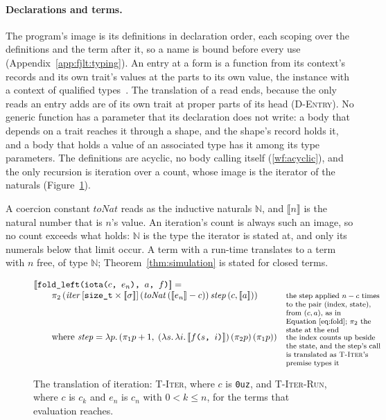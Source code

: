 \paragraph{Declarations and terms.}
The program's image is its definitions in declaration order, each scoping over the definitions and the term after it, so a name is bound before every use (Appendix~\ref{app:fjlt:typing}).
An entry at a form is a function from its context's records and its own trait's values at the parts to its own value, the instance with a context of qualified types~\cite{jones1994qualified}.
The translation of a read ends, because the only reads an entry adds are of its own trait at proper parts of its head (\textsc{D-Entry}).
No generic function has a parameter that its declaration does not write: a body that depends on a trait reaches it through a shape, and the shape's record holds it, and a body that holds a value of an associated type has it among its type parameters.
The definitions are acyclic, no body calling itself (\ref{wf:acyclic}), and the only recursion is iteration over a count, whose image is the iterator of the naturals (Figure~\ref{fig:fjlt-recursion}).

A coercion constant $\mathit{toNat}$ reads  as the inductive naturals $\mathbb{N}$, and $\llbracket n \rrbracket$ is the natural number that is $n$'s value.
An iteration's count is always such an image, so no count exceeds what  holds: $\mathbb{N}$ is the type the iterator is stated at, and only its numerals below that limit occur.
A term with a run-time  translates to a term with $n$ free, of type $\mathbb{N}$; Theorem~\ref{thm:simulation} is stated for closed terms.

\begin{figure}[htbp]
\[
\begin{array}{@{}l@{\quad}l@{}}
\llbracket \texttt{fold\_left(iota(}c\texttt{, }e_n\texttt{), }a\texttt{, }f\texttt{)} \rrbracket = {} & \\
\qquad \pi_2\,(\mathit{iter}\,[\texttt{size\_t} \times \llbracket \sigma \rrbracket]\,(\mathit{toNat}\,(\llbracket e_n \rrbracket - c))\,\mathit{step}\,(c, \llbracket a \rrbracket)) & \note{the step applied $n - c$ times to the pair (index, state), from $(c, a)$, as in Equation~\eqref{eq:fold}; $\pi_2$ the state at the end} \\
\qquad \text{where } \mathit{step} = \lambda p.\,(\pi_1 p + 1,\; (\lambda s.\,\lambda i.\,\llbracket f\texttt{(}s\texttt{, }i\texttt{)} \rrbracket)\,(\pi_2 p)\,(\pi_1 p)) & \note{the index counts up beside the state, and the step's call is translated as \textsc{T-Iter}'s premise types it} \\
\end{array}
\]
\caption{The translation of iteration: \textsc{T-Iter}, where $c$ is \texttt{0uz}, and \textsc{T-Iter-Run}, where $c$ is $c_k$ and $e_n$ is $c_n$ with $0 < k \le n$, for the terms that evaluation reaches.}
\label{fig:fjlt-recursion}
\end{figure}

